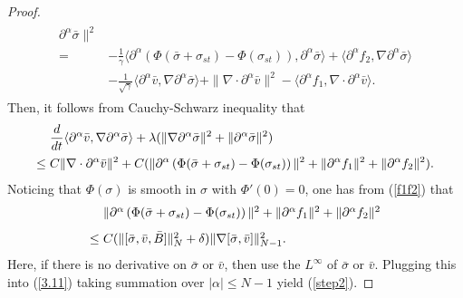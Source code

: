 \documentclass[11pt]{amsart}
\numberwithin{equation}{section}
\begin{document}
\begin{proof}
\begin{eqnarray*}
\begin{array}{rl}
\partial^{\alpha}\bar{\sigma}\|^2\\[3mm]
=&\displaystyle -\frac{1}{\gamma}\langle
\partial^{\alpha}\left(\Phi(\bar{\sigma}+\sigma_{st})-\Phi(\sigma_{st})\right),
\partial^{\alpha}\bar{\sigma}\rangle+\langle\partial^{\alpha}f_{2},\nabla\partial^{\alpha}\bar{\sigma}\rangle\\[3mm]
&-\displaystyle\frac{1}{\sqrt{\gamma}}\langle\partial^{\alpha}\bar{v},\nabla\partial^{\alpha}\bar{\sigma}\rangle
+\|\nabla \cdot
\partial^{\alpha}\bar{v}\|^{2}-\langle\partial^{\alpha}f_{1},\nabla \cdot
\partial^{\alpha}\bar{v}\rangle.
\end{array}
\end{eqnarray*}
Then, it follows from Cauchy-Schwarz inequality that
\begin{eqnarray}\label{3.11}
\arraycolsep=1.5pt
\begin{array}{rl}
 &\displaystyle
\frac{d}{dt}\langle
\partial^{\alpha}\bar{v},\nabla
\partial^{\alpha}\bar{\sigma}\rangle
+\lambda(\|\nabla\partial^{\alpha}\bar{\sigma}\|^{2}+\|
\partial^{\alpha}\bar{\sigma}\|^2)\\[3mm]
\leq & C \displaystyle \|\nabla \cdot
\partial^{\alpha}\bar{v}\|^{2}+C(\|\partial^{\alpha}
\left(\Phi(\bar{\sigma}+\sigma_{st})-\Phi(\sigma_{st})\right) \|^{2}
+\|\partial^{\alpha}f_{1}\|^{2}+\|\partial^{\alpha}f_{2}\|^{2}).
\end{array}
\end{eqnarray}
Noticing that $\Phi(\sigma)$ is smooth in $\sigma$ with
$\Phi'(0)=0$, one has from (\ref{f1f2}) that
\begin{eqnarray*}
\arraycolsep=1.5pt
\begin{array}{rl}
&\|\partial^{\alpha}
\left(\Phi(\bar{\sigma}+\sigma_{st})-\Phi(\sigma_{st})\right) \|^{2}
+\|\partial^{\alpha}f_{1}\|^{2}+\|\partial^{\alpha}f_{2}\|^{2}\\[3mm]
\leq &C(\|[\bar{\sigma},\bar{v},\bar{B}]\|^{2}_{N}+\delta)\|
\nabla[\bar{\sigma},\bar{v}]\|_{N-1}^{2}.
\end{array}
\end{eqnarray*}
Here, if there is no derivative on $\bar{\sigma}$ or $\bar{v}$, then
use the $L^{\infty}$ of $\bar{\sigma}$ or $\bar{v}$. Plugging this
into (\ref{3.11}) taking summation over $|\alpha|\leq N-1$ yield
(\ref{step2}).

\medskip


\end{proof}
\end{document}
